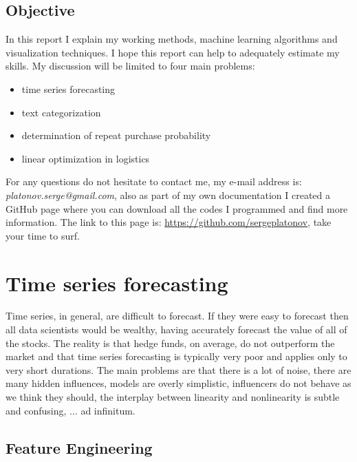 \documentclass[11pt,fleqn]{book} %
\begin{document}
\clearpage
\section{Objective}

In this report I explain my working methods, machine learning algorithms and visualization techniques. I hope this report can help to adequately estimate my skills. My discussion will be limited to four main problems: 

\begin{itemize}
\item time series forecasting 
\item text categorization 
\item determination of repeat purchase probability
\item linear optimization in logistics
\end{itemize}

\begin{remark}
 For any questions do not hesitate to contact me, my e-mail address is: \emph{platonov.serge@gmail.com}, also as part of my own documentation I created a GitHub page where you can download all the codes I programmed and find more information. The link to this page is: \url{https://github.com/sergeplatonov}, take your time to surf.
\end{remark}


\chapter{Time series forecasting}

Time series, in general, are difficult to forecast. If they were easy to forecast then all data scientists would be wealthy, having accurately forecast the value of all of the stocks. The reality is that hedge funds, on average, do not outperform the market and that time series forecasting is typically very poor and applies only to very short durations. The main problems are that there is a lot of noise, there are many hidden influences, models are overly simplistic, influencers do not behave as we think they should, the interplay between linearity and nonlinearity is subtle and confusing, ... ad infinitum.

\section{Feature Engineering}
\end{document}
